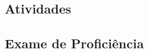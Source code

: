 \documentclass[12pt]{article}
\numberwithin{equation}{section}
\begin{document}
\subsection{Atividades}













\subsection{Exame de Proficiência}
\end{document}
